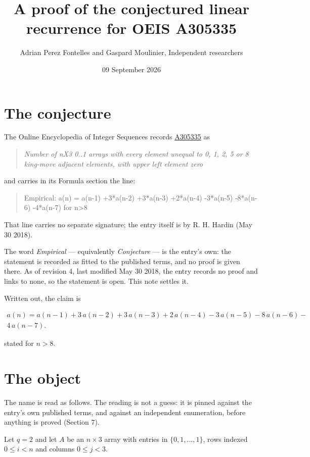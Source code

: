\documentclass[11pt]{article}
\title{A proof of the conjectured linear recurrence for OEIS A305335}
\author{Adrian Perez Fontelles and Gaspard Moulinier, Independent researchers}
\date{09 September 2026}
\theoremstyle{definition}
\begin{document}
\maketitle
\section{The conjecture}

The Online Encyclopedia of Integer Sequences records \href{https://oeis.org/A305335}{A305335} as

\begin{quote}\itshape Number of nX3 0..1 arrays with every element unequal to 0, 1, 2, 5 or 8 king-move adjacent elements, with upper left element zero\end{quote}

and carries in its Formula section the line:

\begin{quote}\ttfamily Empirical: a(n) = a(n-1) +3*a(n-2) +3*a(n-3) +2*a(n-4) -3*a(n-5) -8*a(n-6) -4*a(n-7) for n>8\end{quote}

That line carries no separate signature; the entry itself is by R. H. Hardin (May 30 2018).

The word {\itshape Empirical} --- equivalently {\itshape Conjecture} --- is the entry's own: the statement is recorded as fitted to the published terms, and no proof is given there. As of revision 4, last modified May 30 2018, the entry records no proof and links to none, so the statement is open. This note settles it.

Written out, the claim is

\begin{multline*} a(n) = a(n-1) + 3\,a(n-2) + 3\,a(n-3) + 2\,a(n-4) - 3\,a(n-5) - 8\,a(n-6) - \\ 4\,a(n-7). \end{multline*}

stated for $n > 8$.

\section{The object}

The name is read as follows. The reading is not a guess: it is pinned against the entry's own published terms, and against an independent enumeration, before anything is proved (Section 7).

Let $q = 2$ and let $A$ be an $n \times 3$ array with entries in $\{0,1,\dots,1\}$, rows indexed $0 \le i < n$ and columns $0 \le j < 3$.
\end{document}
